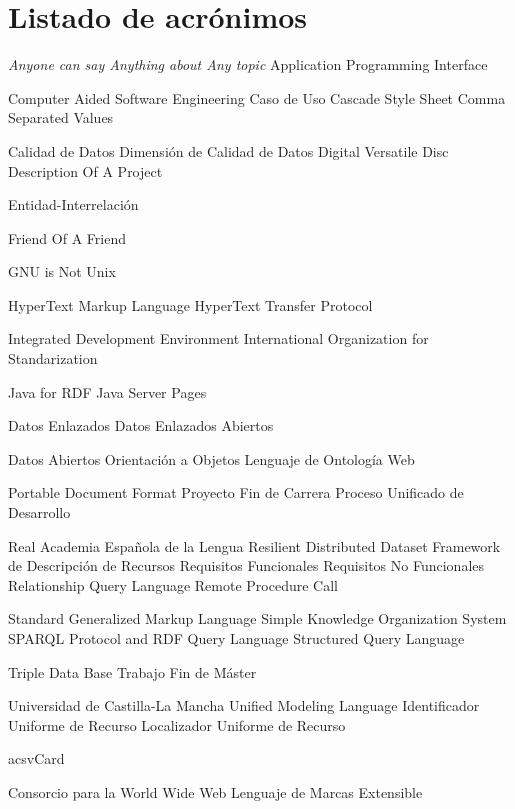 \chapter{Listado de acrónimos}
{\small
\begin{acronym}[XXXXXXXX]
       {\textit{Anyone can say Anything about Any topic}}
       {Application Programming Interface}

      {Computer Aided Software Engineering}
       {Caso de Uso}
       {Cascade Style Sheet}
       {Comma Separated Values}

        {Calidad de Datos}
       {Dimensión de Calidad de Datos}
       {Digital Versatile Disc}
      {Description Of A Project}

        {Entidad-Interrelación}

      {Friend Of A Friend}

       {\acs{GNU} is Not Unix}

      {HyperText Markup Language}
      {HyperText Transfer Protocol}

       {Integrated Development Environment}
       {International Organization for Standarization}

      {Java for \acs{RDF}}
       {Java Server Pages}

        {Datos Enlazados}
       {Datos Enlazados Abiertos}

        {Datos Abiertos}
        {Orientación a Objetos}
       {Lenguaje de Ontología Web}

       {Portable Document Format}
       {Proyecto Fin de Carrera}
       {Proceso Unificado de Desarrollo}

       {Real Academia Española de la Lengua}
       {Resilient Distributed Dataset}
       {Framework de Descripción de Recursos}
        {Requisitos Funcionales}
       {Requisitos No Funcionales}
       {Relationship Query Language}
       {Remote Procedure Call}

      {Standard Generalized Markup Language}
      {Simple Knowledge Organization System}
    {\acs{SPARQL} Protocol and RDF Query Language}
       {Structured Query Language}

       {Triple Data Base}
       {Trabajo Fin de Máster}

      {Universidad de Castilla-La Mancha}
       {Unified Modeling Language}
       {Identificador Uniforme de Recurso}
       {Localizador Uniforme de Recurso}

     {acs{vCard}}

       {Consorcio para la World Wide Web}
       {Lenguaje de Marcas Extensible}

\end{acronym}
}


